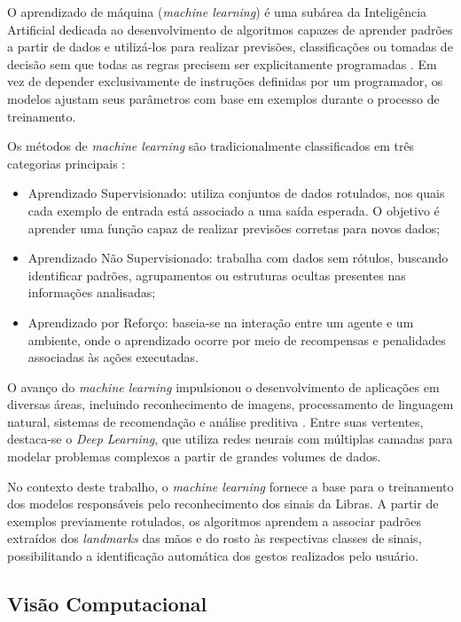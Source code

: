 \documentclass[
    12pt,                %
    openright,           %
    oneside,             %
    a4paper,             %
    english,             %
    brazil               %
]{abntex2}
\begin{document}
O aprendizado de máquina (\textit{machine learning}) é uma subárea da Inteligência Artificial dedicada ao desenvolvimento de algoritmos capazes de aprender padrões a partir de dados e utilizá-los para realizar previsões, classificações ou tomadas de decisão sem que todas as regras precisem ser explicitamente programadas \cite{mitchell1997, faceli2021}. Em vez de depender exclusivamente de instruções definidas por um programador, os modelos ajustam seus parâmetros com base em exemplos durante o processo de treinamento.

Os métodos de \textit{machine learning} são tradicionalmente classificados em três categorias principais \cite{geron2022, oracle_machine_learning}:

\begin{itemize}
    \item Aprendizado Supervisionado: utiliza conjuntos de dados rotulados, nos quais cada exemplo de entrada está associado a uma saída esperada. O objetivo é aprender uma função capaz de realizar previsões corretas para novos dados;
    \item Aprendizado Não Supervisionado: trabalha com dados sem rótulos, buscando identificar padrões, agrupamentos ou estruturas ocultas presentes nas informações analisadas;
    \item Aprendizado por Reforço: baseia-se na interação entre um agente e um ambiente, onde o aprendizado ocorre por meio de recompensas e penalidades associadas às ações executadas.
\end{itemize}

O avanço do \textit{machine learning} impulsionou o desenvolvimento de aplicações em diversas áreas, incluindo reconhecimento de imagens, processamento de linguagem natural, sistemas de recomendação e análise preditiva \cite{faceli2021}. Entre suas vertentes, destaca-se o \textit{Deep Learning}, que utiliza redes neurais com múltiplas camadas para modelar problemas complexos a partir de grandes volumes de dados.

No contexto deste trabalho, o \textit{machine learning} fornece a base para o treinamento dos modelos responsáveis pelo reconhecimento dos sinais da Libras. A partir de exemplos previamente rotulados, os algoritmos aprendem a associar padrões extraídos dos \textit{landmarks} das mãos e do rosto às respectivas classes de sinais, possibilitando a identificação automática dos gestos realizados pelo usuário.


\subsection{Visão Computacional}
\end{document}
